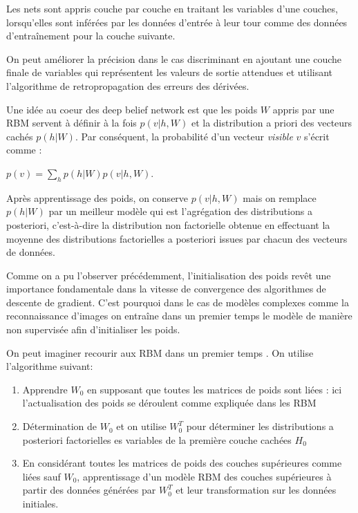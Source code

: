 \documentclass{article}
\theoremstyle{definition}
\begin{document}
\noindent Les nets sont appris couche par couche en traitant les variables d'une couches, lorsqu'elles sont inférées par les données d'entrée à leur tour comme des données d'entraînement pour la couche suivante.

\noindent On peut améliorer la précision dans le cas discriminant en ajoutant une couche finale de variables qui représentent les valeurs de sortie attendues et utilisant l'algorithme de retropropagation des erreurs des dérivées.

\noindent Une idée au coeur des deep belief network est que les poids $W$ appris par une RBM servent à définir à la fois $p(v|h,W)$ et la distribution a priori des vecteurs cachés $p(h|W)$. Par conséquent, la probabilité d'un vecteur \textit{visible} $v$ s'écrit comme :

$p(v)=\displaystyle \sum_h p(h|W)p(v|h,W)$.

\noindent Après apprentissage des poids, on conserve $p(v|h,W)$ mais on remplace $p(h|W)$ par un meilleur modèle qui est l'agrégation des distributions a posteriori, c'est-à-dire la distribution non factorielle obtenue en effectuant la moyenne des distributions factorielles a posteriori issues par chacun des vecteurs de données.

\noindent Comme on a pu l'observer précédemment, l'initialisation des poids revêt une importance fondamentale dans la vitesse de convergence des algorithmes de descente de gradient. C'est pourquoi dans le cas de modèles complexes comme la reconnaissance d'images on entraîne dans un premier temps le modèle de manière non supervisée afin d'initialiser les poids.


\noindent On peut imaginer recourir aux RBM dans un premier temps . On utilise l'algorithme suivant:
\begin{enumerate}
\item Apprendre $W_0$ en supposant que toutes les matrices de poids sont liées : ici l'actualisation des poids se déroulent comme expliquée dans les RBM
\item Détermination de $W_0$ et on utilise $W_0^T$ pour déterminer les distributions a posteriori factorielles es variables de la première couche cachées $H_0$
\item En considérant toutes les matrices de poids des couches supérieures comme liées sauf $W_0$, apprentissage d'un modèle RBM des couches supérieures à partir des données générées par $W_0^T$ et leur transformation sur les données initiales.
\end{enumerate}
\end{document}
